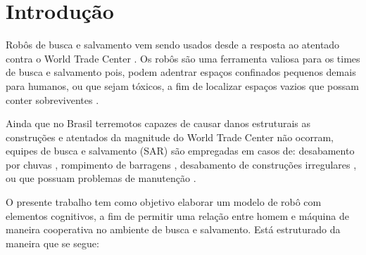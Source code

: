 \documentclass[
	article,			%
	11pt,				%
	oneside,			%
	a4paper,			%
	english,			%
	brazil,				%
	sumario=tradicional	
	]{abntex2}
\begin{document}

%

\textual


\section{Introdução}
Robôs de busca e salvamento vem sendo usados desde a resposta ao atentado contra o World Trade Center \cite{Robin2004}. Os robôs são uma ferramenta valiosa para os times de busca e salvamento pois, podem adentrar espaços confinados pequenos demais para humanos, ou que sejam tóxicos, a fim de localizar espaços vazios que possam conter sobreviventes \cite{Robin2004}.

Ainda que no Brasil terremotos capazes de causar danos estruturais as construções e atentados da magnitude do World Trade Center não ocorram, equipes de busca e salvamento (SAR) são empregadas em casos de: desabamento por chuvas \cite{serrana2022}, rompimento de barragens \cite{bruma2019}, desabamento de construções irregulares \cite{rio2021}, ou que possuam problemas de manutenção \cite{sp2020}.


O presente trabalho tem como objetivo elaborar um modelo de robô com elementos cognitivos, a fim de permitir uma relação entre homem e máquina de maneira cooperativa no ambiente de busca e salvamento. Está estruturado da maneira que se segue:  
\end{document}
